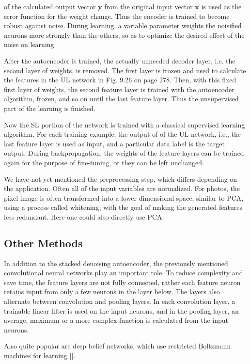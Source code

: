\documentclass[10pt]{book}
\begin{document}
of the calculated output vector $\boldsymbol{y}$ from the original input vector $\boldsymbol{x}$ is used as the error function for the weight change. Thus the encoder is trained to become robust against noise. During learning, a variable parameter weights the noisified neurons more strongly than the others, so as to optimize the desired effect of the noise on learning.

After the autoencoder is trained, the actually unneeded decoder layer, i.e. the second layer of weights, is removed. The first layer is frozen and used to calculate the features in the UL network in Fig. 9.26 on page 278. Then, with this fixed first layer of weights, the second feature layer is trained with the autoencoder algorithm, frozen, and so on until the last feature layer. Thus the unsupervised part of the learning is finished.

Now the SL portion of the network is trained with a classical supervised learning algorithm. For each training example, the output of of the UL network, i.e., the last feature layer is used as input, and a particular data label is the target output. During backpropagation, the weights of the feature layers can be trained again for the purpose of fine-tuning, or they can be left unchanged.

We have not yet mentioned the preprocessing step, which differs depending on the application. Often all of the input variables are normalized. For photos, the pixel image is often transformed into a lower dimensional space, similar to PCA, using a process called whitening, with the goal of making the generated features less redundant. Here one could also directly use PCA.

\subsection{Other Methods}
In addition to the stacked denoising autoencoder, the previously mentioned convolutional neural networks play an important role. To reduce complexity and save time, the feature layers are not fully connected, rather each feature neuron retains input from only a few neurons in the layer below. The layers also alternate between convolution and pooling layers. In each convolution layer, a trainable linear filter is used on the input neurons, and in the pooling layer, an average, maximum or a more complex function is calculated from the input neurons.

Also quite popular are deep belief networks, which use restricted Boltzmann machines for learning [\cite{hinton2006dbn}].
\end{document}
